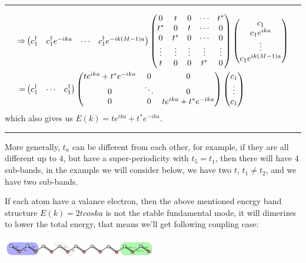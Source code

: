 \documentclass[letterpaper,10pt,english]{sphinxmanual}
\begin{document}
\bigskip\hrule{}\bigskip

\begin{gather}
\begin{split}\Rightarrow &\begin{pmatrix}c_1^\dagger&c_1^\dagger e^{-ika}&\cdots&c_1^\dagger e^{-ik(M-1)a} \end{pmatrix}
\begin{pmatrix} 0 & t &0 & \cdots&t^*\\
t^* &0&t&\cdots&0\\
0&t^*&0&\cdots&0\\
\vdots&\vdots&\vdots&\vdots&\vdots\\
t&0&0&t^*&0
\end{pmatrix}
\begin{pmatrix}c_1\\c_1 e^{ika}\\\vdots\\c_1e^{ik(M-1)a}\end{pmatrix}\\
=&\begin{pmatrix}c_1^\dagger&\cdots&c_1^\dagger \end{pmatrix}
\begin{pmatrix} te^{ika}+t^*e^{-ika} & 0&0\\
0&\ddots&0\\
0&0&te^{ika}+t^*e^{-ika}
\end{pmatrix}
\begin{pmatrix}c_1\\\vdots\\c_1\end{pmatrix}\end{split}\notag
\end{gather}
which also gives us \(E(k)=te^{ika}+t^*e^{-ika}\).


\bigskip\hrule{}\bigskip


More generally, \(t_n\) can be different from each other, for
example, if they are all different up to \(4\), but have a
super-periodicity with \(t_{5}=t_1\), then there will have 4
sub-bands, in the example we will consider below, we have two \(t\),
\(t_1\neq t_2\), and we have two sub-bands.

If each atom have a valance electron, then the above mentioned energy
band structure \(E(k)=2tcoska\) is not the stable fundamental mode,
it will dimerizes to lower the total energy, that means we'll get
following coupling case: 

\includegraphics[width=0.5\textwidth]{2.jpg}
\end{document}
